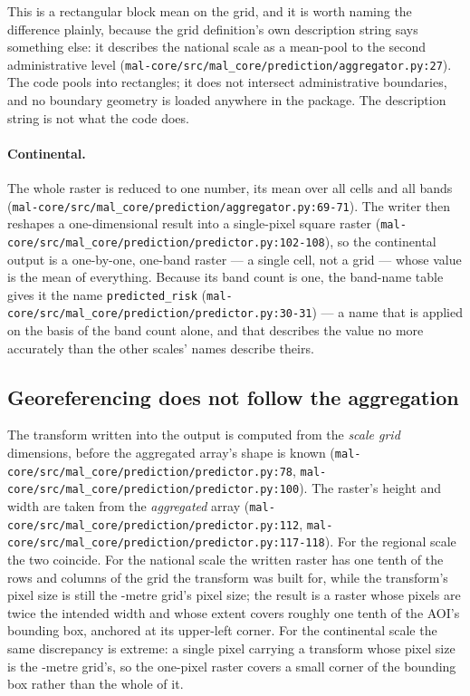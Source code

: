 \documentclass[11pt,a4paper]{article}
\newcommand{\code}[1]{\texttt{#1}}
\begin{document}
This is a rectangular block mean on the grid, and it is worth naming the
difference plainly, because the grid definition's own description string says
something else: it describes the national scale as a mean-pool to the
second administrative level
(\code{mal-core/src/mal\_core/prediction/aggregator.py:27}). The code
pools into rectangles; it does not intersect administrative boundaries, and
no boundary geometry is loaded anywhere in the package. The description
string is not what the code does.

\paragraph{Continental.} The whole raster is reduced to one number, its
mean over all cells and all bands
(\code{mal-core/src/mal\_core/prediction/aggregator.py:69-71}). The writer
then reshapes a one-dimensional result into a single-pixel square raster
(\code{mal-core/src/mal\_core/prediction/predictor.py:102-108}), so the
continental output is a one-by-one, one-band raster --- a single cell, not a
grid --- whose value is the mean
of everything. Because its band count is one, the band-name table gives it
the name \code{predicted\_risk}
(\code{mal-core/src/mal\_core/prediction/predictor.py:30-31}) --- a name that
is applied on the basis of the band count alone, and that describes the
value no more accurately than the other scales' names describe theirs.

\subsection{Georeferencing does not follow the aggregation}

The transform written into the output is computed from the \emph{scale grid}
dimensions, before the aggregated array's shape is known
(\code{mal-core/src/mal\_core/prediction/predictor.py:78},
\code{mal-core/src/mal\_core/prediction/predictor.py:100}). The raster's
height and width are taken from the \emph{aggregated} array
(\code{mal-core/src/mal\_core/prediction/predictor.py:112},
\code{mal-core/src/mal\_core/prediction/predictor.py:117-118}). For the
regional scale the two coincide. For the national scale the written raster
has one tenth of the rows and columns of the grid the transform was built
for, while the transform's pixel size is still the
-metre grid's pixel
size; the result is a raster whose pixels are twice the intended width and
whose extent covers roughly one tenth of the AOI's bounding box, anchored at
its upper-left corner. For the continental scale the same discrepancy is
extreme: a single pixel carrying a transform whose pixel size is the
-metre grid's, so the one-pixel
raster covers a small corner of the
bounding box rather than the whole of it.
\end{document}
